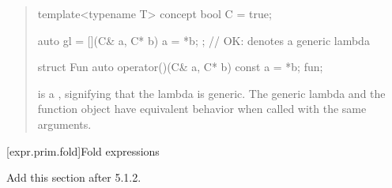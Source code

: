 \begin{quote}
\begin{addedblock}
\enterexample
\begin{codeblock}
template<typename T> concept bool C = true;

auto gl = [](C& a, C* b) { a = *b; }; // OK: denotes a generic lambda

struct Fun {
  auto operator()(C& a, C* b) const { a = *b; }
} fun;
\end{codeblock}
 is a 
,
signifying that the lambda is generic. The generic lambda 
and the function object  have equivalent behavior when 
called with the same arguments.
\exitexample
\end{addedblock}
\end{quote}

[expr.prim.fold]{Fold expressions}

Add this section after 5.1.2.

